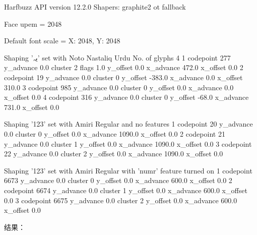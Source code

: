 \begin{typing}

Harfbuzz API version	12.2.0
Shapers:	graphite2	ot	fallback

Face upem = 2048

Default font scale = X: 2048, Y: 2048

Shaping 'یہ' set with Noto Nastaliq Urdu
No. of glyphs	4
1
	codepoint	277
	y_advance	0.0
	cluster	2
	flags	1.0
	y_offset	0.0
	x_advance	472.0
	x_offset	0.0
2
	codepoint	19
	y_advance	0.0
	cluster	0
	y_offset	-383.0
	x_advance	0.0
	x_offset	310.0
3
	codepoint	985
	y_advance	0.0
	cluster	0
	y_offset	0.0
	x_advance	0.0
	x_offset	0.0
4
	codepoint	316
	y_advance	0.0
	cluster	0
	y_offset	-68.0
	x_advance	731.0
	x_offset	0.0

Shaping '123' set with Amiri Regular and no features
1
	codepoint	20
	y_advance	0.0
	cluster	0
	y_offset	0.0
	x_advance	1090.0
	x_offset	0.0
2
	codepoint	21
	y_advance	0.0
	cluster	1
	y_offset	0.0
	x_advance	1090.0
	x_offset	0.0
3
	codepoint	22
	y_advance	0.0
	cluster	2
	y_offset	0.0
	x_advance	1090.0
	x_offset	0.0

Shaping '123' set with Amiri Regular with 'numr' feature turned on
1
	codepoint	6673
	y_advance	0.0
	cluster	0
	y_offset	0.0
	x_advance	600.0
	x_offset	0.0
2
	codepoint	6674
	y_advance	0.0
	cluster	1
	y_offset	0.0
	x_advance	600.0
	x_offset	0.0
3
	codepoint	6675
	y_advance	0.0
	cluster	2
	y_offset	0.0
	x_advance	600.0
	x_offset	0.0
\end{typing}

\medskip
结果：

